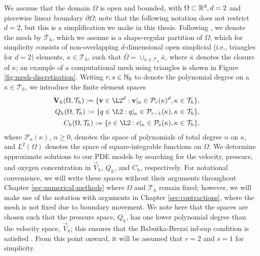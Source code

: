         \setcounter{equation}{0}
        We assume that the domain $\Omega$ is open and bounded, with $\Omega \subset \mathbb{R}^d, d = 2$ and piecewise linear boundary $\partial\Omega$; note that the following notation does not restrict $d=2$, but this is a simplification we make in this thesis. Following \cite{cangianiHpVersionDiscontinuousGalerkin2017}, we denote the mesh by $\mathcal{T}_h$, which we assume is a shape-regular partition of $\Omega$, which for simplicity consists of non-overlapping $d$-dimensional open simplicial (i.e., triangles for $d=2$) elements, $\kappa \in \mathcal{T}_h$, such that $\bar{\Omega} = \cup_{\kappa \in \mathcal{T}_h} \bar{\kappa}$, where $\bar{\kappa}$ denotes the closure of $\kappa$; an example of a computational mesh using triangles is shown in Figure \ref{fig:mesh-discretisation}. Writing $r, s \in \mathbb{N}_0$ to denote the polynomial degree on a $\kappa \in \mathcal{T}_h$, we introduce the finite element spaces
        \begin{align}
            \begin{split}
                \vec{V}_h (\Omega, \mathcal{T}_h) & := \{ \vec{v} \in \L2^d : \vec{v}|_\kappa \in \mathcal{P}_r(\kappa)^d, \kappa \in \mathcal{T}_h \},
            \end{split}\\
            \begin{split}
                Q_h (\Omega, \mathcal{T}_h) & := \{ q \in \L2 : q|_\kappa \in \mathcal{P}_{r-1}(\kappa), \kappa \in \mathcal{T}_h \},
            \end{split}\\
            \begin{split}
                C_h (\Omega, \mathcal{T}_h) & := \{ c \in \L2 : c|_\kappa \in \mathcal{P}_{s}(\kappa), \kappa \in \mathcal{T}_h \},
            \end{split}
            \label{eq:velocity-spaces}
        \end{align}
        where $\mathcal{P}_n(\kappa)$, $n \geq 0$, denotes the space of polynomials of total degree $n$ on $\kappa$, and $L^2(\Omega)$ denotes the space of square-integrable functions on $\Omega$. We determine approximate solutions to our PDE models by searching for the velocity, pressure, and oxygen concentration in $\vec{V}_h$, $Q_h$, and $C_h$, respectively. For notational convenience, we will write these spaces without their arguments throughout Chapter \ref{sec:numerical-methods} where $\Omega$ and $\mathcal{T}_h$ remain fixed; however, we will make use of the notation with arguments in Chapter \ref{sec:contractions}, where the mesh is not fixed due to boundary movement. We note here that the spaces are chosen such that the pressure space, $Q_h$, has one lower polynomial degree than the velocity space, $\vec{V}_h$; this ensures that the Babu\u ska-Brezzi inf-sup condition is satisfied \cite{gerdesHpfiniteElementSimulations1999}. From this point onward, it will be assumed that $r = 2$ and $s = 1$ for simplicity.
    
